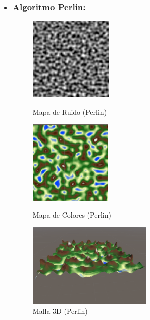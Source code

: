\begin{itemize}
   \item \subsubsection{Algoritmo Perlin:}
   \begin{figure}[htbp]
    \begin{minipage}[t]{0.3\linewidth}
        \centering
        \includegraphics[width=\textwidth, height=4cm]{img/codes/Perlin123.png}
        \caption{Mapa de Ruido (Perlin)}
    \end{minipage}%
    \hfill
    \begin{minipage}[t]{0.3\linewidth}
        \centering
        \includegraphics[width=\textwidth, height=4cm]{img/codes/PerlinColores.png}
        \caption{Mapa de Colores (Perlin)}
    \end{minipage}%
    \hfill
    \begin{minipage}[t]{0.3\linewidth}
        \centering
        \includegraphics[width=\textwidth, height=4cm]{img/codes/Perlin3D.png}
        \caption{Malla 3D (Perlin)}
    \end{minipage}
    
    \end{figure}
    

\end{itemize}
